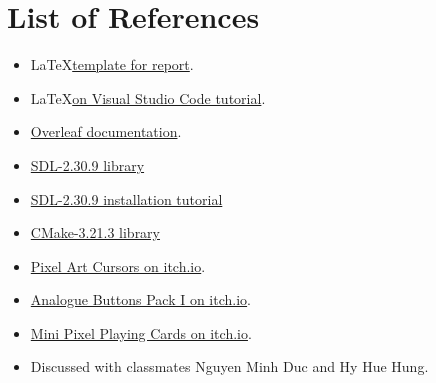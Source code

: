 \section{List of References}
\label{sec:references-list}

\begin{itemize}
    \item \LaTeX \space \href{https://github.com/khongsomeo/hcmus-unofficial-report-template}{template for report}.
    \item \LaTeX \space \href{https://youtu.be/4lyHIQl4VM8}{on Visual Studio Code tutorial}.
    \item \href{https://www.overleaf.com/learn/}{Overleaf documentation}.
    \item \href{https://github.com/libsdl-org/SDL/releases/tag/release-2.30.9}{SDL-2.30.9 library}
    \item \href{https://lazyfoo.net/tutorials/SDL}{SDL-2.30.9 installation tutorial}
    \item \href{https://cmake.org/download}{CMake-3.21.3 library}
    \item \href{https://aspecsgaming.itch.io/pixel-art-cursors}{Pixel Art Cursors on itch.io}.
    \item \href{https://prinbles.itch.io/analogue-buttons-pack-i}{Analogue Buttons Pack I on itch.io}.
    \item \href{https://aspecsgaming.itch.io/mini-pixel-playing-cards?download}{Mini Pixel Playing Cards on itch.io}.
    \item Discussed with classmates Nguyen Minh Duc and Hy Hue Hung.
\end{itemize}

